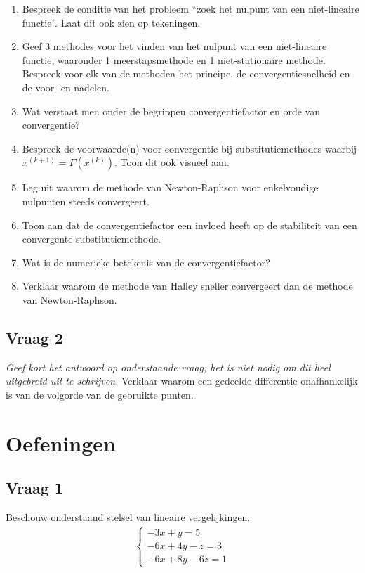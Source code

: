 \documentclass[kulak]{kulakarticle}
\begin{document}
	\begin{enumerate}
		\item Bespreek de conditie van het probleem ``zoek het nulpunt van een niet-lineaire functie''. Laat dit ook zien op tekeningen.
		\item Geef 3 methodes voor het vinden van het nulpunt van een niet-lineaire functie, waaronder 1 meerstapsmethode en 1 niet-stationaire methode. Bespreek voor elk van de methoden het principe, de convergentiesnelheid en de voor- en nadelen.
		\item Wat verstaat men onder de begrippen convergentiefactor en orde van convergentie?
		\item Bespreek de voorwaarde(n) voor convergentie bij substitutiemethodes waarbij \(x^{(k+1)}=F\left(x^{(k)}\right)\). Toon dit ook visueel aan.
		\item Leg uit waarom de methode van Newton-Raphson voor enkelvoudige nulpunten steeds convergeert.
		\item Toon aan dat de convergentiefactor een invloed heeft op de stabiliteit van een convergente substitutiemethode.
		\item Wat is de numerieke betekenis van de convergentiefactor?
		\item Verklaar waarom de methode van Halley sneller convergeert dan de methode van Newton-Raphson.
	\end{enumerate}

	\subsection*{Vraag 2}

	\textit{Geef kort het antwoord op onderstaande vraag; het is niet nodig om dit heel uitgebreid uit te schrijven.}
	Verklaar waarom een gedeelde differentie onafhankelijk is van de volgorde van de gebruikte punten.

	\newpage

	\section*{Oefeningen}

	\subsection*{Vraag 1}

	Beschouw onderstaand stelsel van lineaire vergelijkingen.
	\begin{align*}
		\begin{cases}
			-3x + y = 5\\
			-6x + 4y - z = 3\\
			-6x + 8y - 6z = 1
		\end{cases}
	\end{align*}
\end{document}
